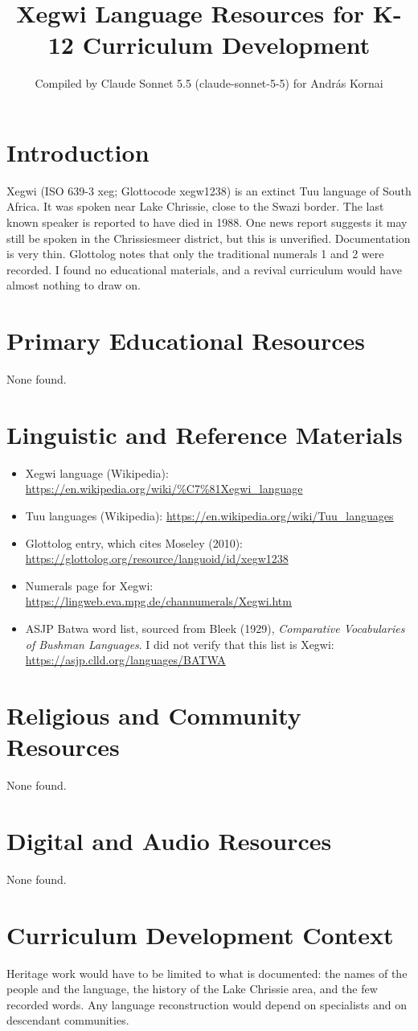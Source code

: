 \documentclass[12pt]{article}
\title{\textbardbl Xegwi Language Resources for K-12 Curriculum Development}
\author{Compiled by Claude Sonnet 5.5 (claude-sonnet-5-5) for Andr\'as Kornai}
\date{}
\begin{document}
\maketitle

\section{Introduction}
\textbardbl Xegwi (ISO 639-3 xeg; Glottocode xegw1238) is an extinct Tuu language of South Africa. It was spoken near Lake Chrissie, close to the Swazi border. The last known speaker is reported to have died in 1988. One news report suggests it may still be spoken in the Chrissiesmeer district, but this is unverified. Documentation is very thin. Glottolog notes that only the traditional numerals 1 and 2 were recorded. I found no educational materials, and a revival curriculum would have almost nothing to draw on.

\section{Primary Educational Resources}
None found.

\section{Linguistic and Reference Materials}
\begin{itemize}
\item \textbardbl Xegwi language (Wikipedia): \url{https://en.wikipedia.org/wiki/%C7%81Xegwi_language}
\item Tuu languages (Wikipedia): \url{https://en.wikipedia.org/wiki/Tuu_languages}
\item Glottolog entry, which cites Moseley (2010): \url{https://glottolog.org/resource/languoid/id/xegw1238}
\item Numerals page for \textbardbl Xegwi: \url{https://lingweb.eva.mpg.de/channumerals/Xegwi.htm}
\item ASJP Batwa word list, sourced from Bleek (1929), \emph{Comparative Vocabularies of Bushman Languages}. I did not verify that this list is \textbardbl Xegwi: \url{https://asjp.clld.org/languages/BATWA}
\end{itemize}

\section{Religious and Community Resources}
None found.

\section{Digital and Audio Resources}
None found.

\section{Curriculum Development Context}
Heritage work would have to be limited to what is documented: the names of the people and the language, the history of the Lake Chrissie area, and the few recorded words. Any language reconstruction would depend on specialists and on descendant communities.
\end{document}
